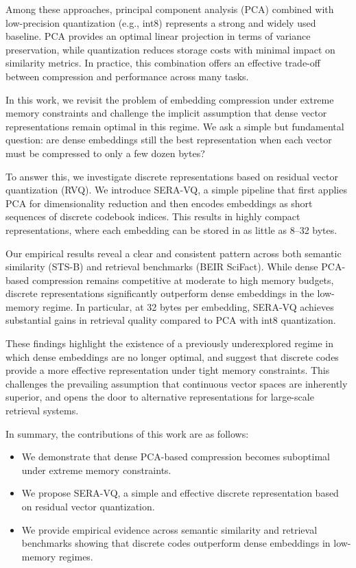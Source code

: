\documentclass{article}
\begin{document}
Among these approaches, principal component analysis (PCA) combined with low-precision quantization (e.g., int8) represents a strong and widely used baseline. PCA provides an optimal linear projection in terms of variance preservation, while quantization reduces storage costs with minimal impact on similarity metrics. In practice, this combination offers an effective trade-off between compression and performance across many tasks.

In this work, we revisit the problem of embedding compression under extreme memory constraints and challenge the implicit assumption that dense vector representations remain optimal in this regime. We ask a simple but fundamental question: are dense embeddings still the best representation when each vector must be compressed to only a few dozen bytes?

To answer this, we investigate discrete representations based on residual vector quantization (RVQ). We introduce SERA-VQ, a simple pipeline that first applies PCA for dimensionality reduction and then encodes embeddings as short sequences of discrete codebook indices. This results in highly compact representations, where each embedding can be stored in as little as 8--32 bytes.

Our empirical results reveal a clear and consistent pattern across both semantic similarity (STS-B) and retrieval benchmarks (BEIR SciFact). While dense PCA-based compression remains competitive at moderate to high memory budgets, discrete representations significantly outperform dense embeddings in the low-memory regime. In particular, at 32 bytes per embedding, SERA-VQ achieves substantial gains in retrieval quality compared to PCA with int8 quantization.

These findings highlight the existence of a previously underexplored regime in which dense embeddings are no longer optimal, and suggest that discrete codes provide a more effective representation under tight memory constraints. This challenges the prevailing assumption that continuous vector spaces are inherently superior, and opens the door to alternative representations for large-scale retrieval systems.

In summary, the contributions of this work are as follows:
\begin{itemize}
    \item We demonstrate that dense PCA-based compression becomes suboptimal under extreme memory constraints.
    \item We propose SERA-VQ, a simple and effective discrete representation based on residual vector quantization.
    \item We provide empirical evidence across semantic similarity and retrieval benchmarks showing that discrete codes outperform dense embeddings in low-memory regimes.
\end{itemize}
\end{document}
